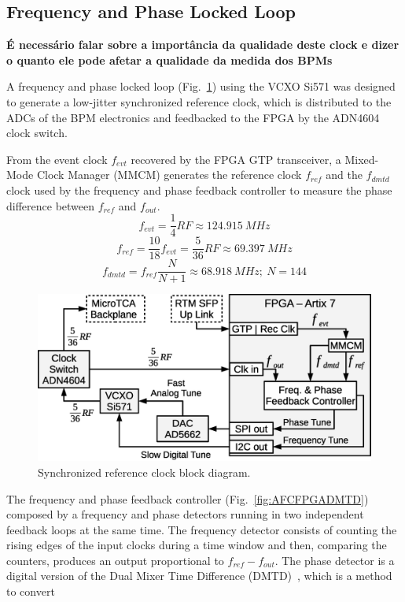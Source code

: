 \documentclass[a4paper,
               biblatex,      %
               ]{jacow}
\begin{document}
\subsection{Frequency and Phase Locked Loop}
 \textbf{É necessário falar sobre a importância da qualidade deste clock e dizer o quanto ele pode afetar a qualidade da medida dos BPMs}
 
 A frequency and phase locked loop (Fig.~\ref{fig:AFCRefClockLoop}) using the VCXO Si571 was designed to generate a low-jitter synchronized reference clock, which is distributed to the ADCs of the BPM electronics and feedbacked to the FPGA by the ADN4604 clock switch.

From the event clock $f_{evt}$ recovered by the FPGA GTP transceiver, a Mixed-Mode Clock Manager (MMCM) generates the reference clock $f_{ref}$ and the $f_{dmtd}$ clock used by the frequency and phase feedback controller to measure the phase difference between $f_{ref}$ and $f_{out}$.
\[f_{evt} = \frac{1}{4}RF \approx 124.915~MHz\]
\[f_{ref} = \frac{10}{18}f_{evt} = \frac{5}{36}RF \approx 69.397~MHz\]
\[f_{dmtd} = f_{ref}\frac{N}{N+1} \approx 68.918~MHz;~N=144\]

\begin{figure}[!htb]
   \centering
   \includegraphics*[width=0.8\columnwidth]{AFCRefClockLoop}
   \caption{Synchronized reference clock block diagram.}
   \label{fig:AFCRefClockLoop}
\end{figure}

The frequency and phase feedback controller (Fig.~\ref{fig:AFCFPGADMTD}) composed by a frequency and phase detectors running in two independent feedback loops at the same time. The frequency detector consists of counting the rising edges of the input clocks during a time window and then, comparing the counters, produces an output proportional to $f_{ref}-f_{out}$. The phase detector is a digital version of the Dual Mixer Time Difference (DMTD)~\cite{allan1975picosecond}, which is a method to convert 
\end{document}
